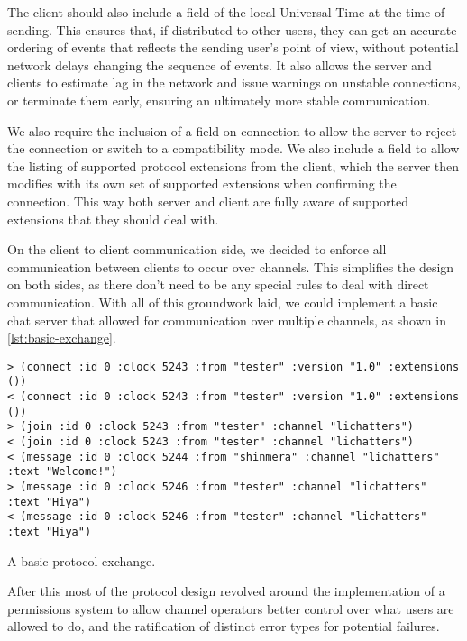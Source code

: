 \documentclass[format=sigconf]{acmart}
\begin{document}
The client should also include a  field of the local Universal-Time at the time of sending. This ensures that, if distributed to other users, they can get an accurate ordering of events that reflects the sending user's point of view, without potential network delays changing the sequence of events. It also allows the server and clients to estimate lag in the network and issue warnings on unstable connections, or terminate them early, ensuring an ultimately more stable communication.

We also require the inclusion of a  field on connection to allow the server to reject the connection or switch to a compatibility mode. We also include a  field to allow the listing of supported protocol extensions from the client, which the server then modifies with its own set of supported extensions when confirming the connection. This way both server and client are fully aware of supported extensions that they should deal with.

On the client to client communication side, we decided to enforce all communication between clients to occur over channels. This simplifies the design on both sides, as there don't need to be any special rules to deal with direct communication. With all of this groundwork laid, we could implement a basic chat server that allowed for communication over multiple channels, as shown in \autoref{lst:basic-exchange}.

\begin{listing}[h]
\begin{verbatim}
> (connect :id 0 :clock 5243 :from "tester" :version "1.0" :extensions ())
< (connect :id 0 :clock 5243 :from "tester" :version "1.0" :extensions ())
> (join :id 0 :clock 5243 :from "tester" :channel "lichatters")
< (join :id 0 :clock 5243 :from "tester" :channel "lichatters")
< (message :id 0 :clock 5244 :from "shinmera" :channel "lichatters" :text "Welcome!")
> (message :id 0 :clock 5246 :from "tester" :channel "lichatters" :text "Hiya")
< (message :id 0 :clock 5246 :from "tester" :channel "lichatters" :text "Hiya")
\end{verbatim}
\caption{A basic protocol exchange.}
\label{lst:basic-exchange}
\end{listing}

After this most of the protocol design revolved around the implementation of a permissions system to allow channel operators better control over what users are allowed to do, and the ratification of distinct error types for potential failures.
\end{document}
